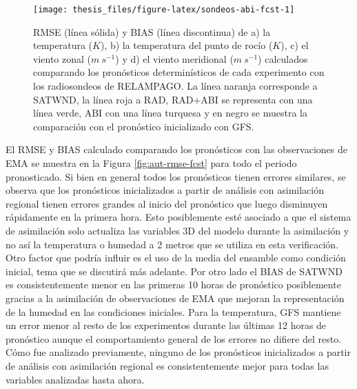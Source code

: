 \documentclass[12pt,oneside,a4paper]{reedthesis}
\begin{document}
\begin{figure}

{\centering \texttt{[image: thesis\_files/figure-latex/sondeos-abi-fcst-1]} 

}

\caption{RMSE (línea sólida) y BIAS (línea discontinua) de a) la temperatura (\(K\)), b) la temperatura del punto de rocío (\(K\)), c) el viento zonal (\(m\ s^{-1}\)) y d) el viento meridional (\(m\ s^{-1}\)) calculados comparando los pronósticos determinísticos de cada experimento con los radiosondeos de RELAMPAGO. La línea naranja corresponde a SATWND, la línea roja a RAD, RAD+ABI se representa con una línea verde, ABI con una línea turquesa y en negro se muestra la comparación con el pronóstico inicializado con GFS.}\label{fig:sondeos-abi-fcst}
\end{figure}
El RMSE y BIAS calculado comparando los pronósticos con las observaciones de EMA se muestra en la Figura \ref{fig:aut-rmse-fcst} para todo el periodo pronosticado. Si bien en general todos los pronósticos tienen errores similares, se observa que los pronósticos inicializados a partir de análisis con asimilación regional tienen errores grandes al inicio del pronóstico que luego disminuyen rápidamente en la primera hora. Esto posiblemente esté asociado a que el sistema de asimilación solo actualiza las variables 3D del modelo durante la asimilación y no así la temperatura o humedad a 2 metros que se utiliza en esta verificación. Otro factor que podría influir es el uso de la media del ensamble como condición inicial, tema que se discutirá más adelante. Por otro lado el BIAS de SATWND es consistentemente menor en las primeras 10 horas de pronóstico posiblemente gracias a la asimilación de observaciones de EMA que mejoran la representación de la humedad en las condiciones iniciales. Para la temperatura, GFS mantiene un error menor al resto de los experimentos durante las últimas 12 horas de pronóstico aunque el comportamiento general de los errores no difiere del resto. Cómo fue analizado previamente, ninguno de los pronósticos inicializados a partir de análisis con asimilación regional es consistentemente mejor para todas las variables analizadas hasta ahora.
\end{document}
